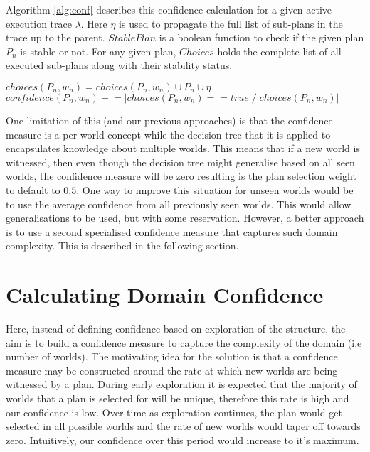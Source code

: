 \documentclass[a4paper]{article}
\begin{document}
Algorithm \ref{alg:conf} describes this confidence calculation for a given active execution trace $\lambda$. Here $\eta$ is used to propagate the full list of sub-plans in the trace up to the parent. $StablePlan$ is a boolean function to check if the given plan $P_n$ is stable or not. For any given plan, $Choices$ holds the complete list of all executed sub-plans along with their stability status.

\begin{algorithm}[ht]
$choices(P_n,w_n) = choices(P_n,w_n) \cup P_n \cup \eta$\;
$confidence(P_n,w_n) +\!\!= |choices(P_n,w_n) == true|/|choices(P_n,w_n)|$\;
\caption{$UpdateConfidence(\lambda, \eta, k, \epsilon)$}
\label{alg:conf}
\end{algorithm}

One limitation of this (and our previous approaches) is that the confidence measure is a per-world concept while the decision tree that it is applied to encapsulates knowledge about multiple worlds. This means that if a new world is witnessed, then even though the decision tree might generalise based on all seen worlds, the confidence measure will be zero resulting is the plan selection weight to default to $0.5$. One way to improve this situation for unseen worlds would be to use the average confidence from all previously seen worlds. This would allow generalisations to be used, but with some reservation. However, a better approach is to use a second specialised confidence measure that captures such domain complexity. This is described in the following section.



\section{Calculating Domain Confidence}

Here, instead of defining confidence based on exploration of the structure, the aim is to build a confidence measure to capture the complexity of the domain (i.e number of worlds). The motivating idea for the solution is that a confidence measure may be constructed around the rate at which new worlds are being witnessed by a plan. During early exploration it is expected that the majority of worlds that a plan is selected for will be unique, therefore this rate is high and our confidence is low. Over time as exploration continues, the plan would get selected in all possible worlds and the rate of new worlds would taper off towards zero. Intuitively, our confidence over this period would increase to it's maximum. 
\end{document}
